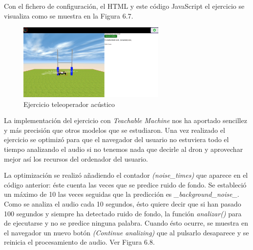 Con el fichero de configuración, el HTML y este código JavaScript el ejercicio se visualiza como se muestra en la Figura 6.7.

\begin{figure}[H]
    \centering
    \includegraphics[width=0.65\textwidth, height=0.35\textwidth]{chapters/images/audio.png}
    \caption{Ejercicio teleoperador acústico}
    \label{fig:my_label}
\end{figure}

La implementación del ejercicio con \textit{Teachable Machine}  nos ha aportado sencillez y más precisión que otros modelos que se estudiaron.
Una vez realizado el ejercicio se optimizó para que el navegador del usuario no estuviera todo el tiempo analizando el  audio si no tenemos nada que decirle al dron y aprovechar mejor así los recursos del ordenador del usuario.

La optimización se realizó añadiendo el contador \textit{(noise\_times)} que aparece en el código anterior: éste cuenta las veces que se predice ruido de fondo. Se estableció un máximo de 10 las veces seguidas que la predicción es \textit{\_background\_noise\_}. Como se analiza el audio cada 10 segundos, ésto quiere decir que si han pasado 100 segundos y siempre ha detectado ruido de fondo, la función \textit{analizar()} para de ejecutarse y no se predice ninguna palabra. Cuando ésto ocurre, se muestra en el navegador un nuevo botón \textit{(Continue analizing)} que al pulsarlo desaparece y se reinicia el procesamiento de audio. Ver Figura 6.8.

